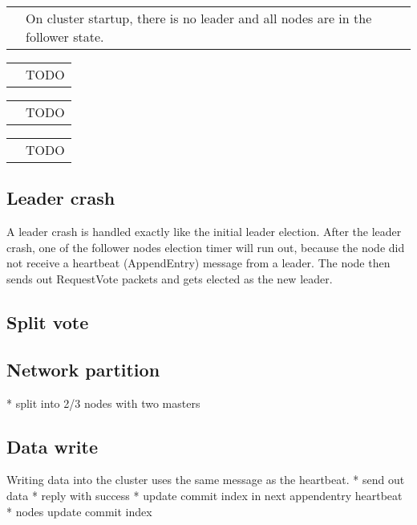 \begin{tabularx}{\textwidth}{  p{150px}  X  }
  \noindent\parbox[c]{\hsize}{
  \def\svgwidth{150}
  
  } & On cluster startup, there is no leader and all nodes are in the follower state.
\end{tabularx}

\begin{tabularx}{\textwidth}{  p{150px}  X  }
  \noindent\parbox[c]{\hsize}{
  \def\svgwidth{150}
  
  } & TODO
\end{tabularx}

\begin{tabularx}{\textwidth}{  p{150px}  X  }
  \noindent\parbox[c]{\hsize}{
  \def\svgwidth{150}
  
  } & TODO
\end{tabularx}

\begin{tabularx}{\textwidth}{  p{150px}  X  }
  \noindent\parbox[c]{\hsize}{
  \def\svgwidth{150}
  
  } &TODO
\end{tabularx}



\subsection{Leader crash}
A leader crash is handled exactly like the initial leader election.
After the leader crash, one of the follower nodes election timer will run out, because the node did not receive a heartbeat (AppendEntry) message from a leader. The node then sends out 
RequestVote packets and gets elected as the new leader.

\subsection{Split vote}

\subsection{Network partition}
* split into 2/3 nodes with two masters

\subsection{Data write}
Writing data into the cluster uses the same message as the heartbeat.
* send out data
* reply with success
* update commit index in next appendentry heartbeat
* nodes update commit index

